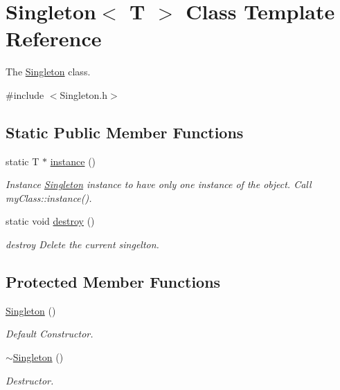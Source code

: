 \hypertarget{class_singleton}{}\section{Singleton$<$ T $>$ Class Template Reference}
\label{class_singleton}


The \hyperlink{class_singleton}{Singleton} class.  




{\ttfamily \#include $<$Singleton.\+h$>$}

\subsection*{Static Public Member Functions}
\begin{DoxyCompactItemize}
\item 
static T $\ast$ \hyperlink{class_singleton_a653aa7351e551af1bae09d01aa713091}{instance} ()
\begin{DoxyCompactList}\small\item\em Instance \hyperlink{class_singleton}{Singleton} instance to have only one instance of the object. Call my\+Class\+::instance(). \end{DoxyCompactList}\item 
\mbox{\label{class_singleton_a4e002a1eab6553b9bce6af8ebd4d3804}} 
static void \hyperlink{class_singleton_a4e002a1eab6553b9bce6af8ebd4d3804}{destroy} ()
\begin{DoxyCompactList}\small\item\em destroy Delete the current singelton. \end{DoxyCompactList}\end{DoxyCompactItemize}
\subsection*{Protected Member Functions}
\begin{DoxyCompactItemize}
\item 
\mbox{\label{class_singleton_a923b995920da9c06590adb170ab2f890}} 
\hyperlink{class_singleton_a923b995920da9c06590adb170ab2f890}{Singleton} ()
\begin{DoxyCompactList}\small\item\em Default Constructor. \end{DoxyCompactList}\item 
\mbox{\label{class_singleton_ac6e7af82cba33f561bd64e5e0243e7f8}} 
\hyperlink{class_singleton_ac6e7af82cba33f561bd64e5e0243e7f8}{$\sim$\+Singleton} ()
\begin{DoxyCompactList}\small\item\em Destructor. \end{DoxyCompactList}\end{DoxyCompactItemize}


